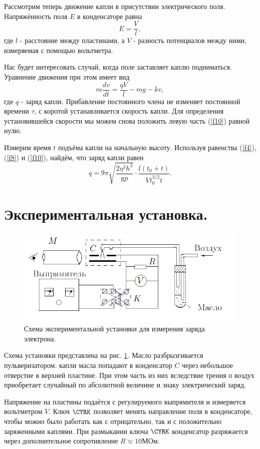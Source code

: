 \documentclass[a4paper, 12pt, twoside]{article}
\begin{document}
Рассмотрим теперь движение капли в присутствии электрического поля. Напряжённость поля $E$ в конденсаторе равна
\begin{equation}
\label{f9}
E = \dfrac{V}{l},
\end{equation}
где $l$ - расстояние между пластинами, а $V$ - разность потенциалов между ними, измеряемая с помощью вольтметра.

Нас будет интересовать случай, когда поле заставляет каплю подниматься. Уравнение движения при этом имеет вид
\begin{equation}
\label{f10}
m\dfrac{dv}{dt} = \dfrac{qV}{l} - mg - kv,
\end{equation}
где $q$ - заряд капли. Прибавление постоянного члена не изменяет постоянной времени $\tau$, с коротой устанавливается скорость капли. Для определения установившейся скорости мы можем снова положить левую часть (\ref{f10}) равной нулю.

Измерим время $t$ подъёма капли на начальную высоту. Используя равенства (\ref{f4}), (\ref{f8}) и (\ref{f10}), найдём, что заряд капли равен
\begin{equation}
\label{f11}
q = 9\pi \sqrt{\dfrac{2\eta^{3}h^{3}}{\text{g}p}}\cdot \dfrac{l(t_{0} + t)}{V t_{0}^{3/2}t}.
\end{equation}
\newpage
\section{Экспериментальная установка.}

\begin{figure}[H]
	\centering
	\includegraphics[width = 0.6 \textwidth]{ust}
	\caption{Схема экспериментальной установки для измерения заряда электрона.}
	\label{ust}
\end{figure}

Схема установки представлена на рис. \ref{ust}. Масло разбрызгивается пульверизатором. капли масла попадают в конденсатор $C$ через небольшое отверстие в верхней пластине. При этом часть из них вследствие трения о воздух приобретает случайный по абсолютной величине и знаку электрический заряд.

Напряжение на пластины подаётся с регулируемого выпрямителя и измеряется вольтметром $V$. Ключ $\CYRK$ позволяет менять направление поля в конденсаторе, чтобы можно было работать как с отрицательно, так и с положительно заряженными каплями. При размыкании ключа $\CYRK$ конденсатор разряжается через дополнительное сопротивление  $R \approx 10\text{МОм.}$
\end{document}
